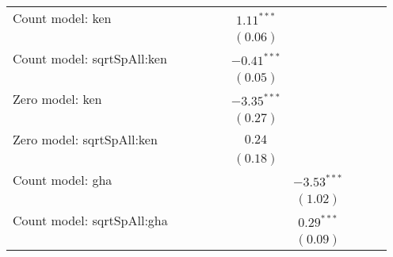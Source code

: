 \begin{center}
\begin{longtable}{l c c c c c c c c c}
Count model: ken               &                &                &                &                 & $1.11^{***}$   &                 &                 &                 &                \\
                               &                &                &                &                 & $(0.06)$       &                 &                 &                 &                \\
Count model: sqrtSpAll:ken     &                &                &                &                 & $-0.41^{***}$  &                 &                 &                 &                \\
                               &                &                &                &                 & $(0.05)$       &                 &                 &                 &                \\
Zero model: ken                &                &                &                &                 & $-3.35^{***}$  &                 &                 &                 &                \\
                               &                &                &                &                 & $(0.27)$       &                 &                 &                 &                \\
Zero model: sqrtSpAll:ken      &                &                &                &                 & $0.24$         &                 &                 &                 &                \\
                               &                &                &                &                 & $(0.18)$       &                 &                 &                 &                \\
Count model: gha               &                &                &                &                 &                & $-3.53^{***}$   &                 &                 &                \\
                               &                &                &                &                 &                & $(1.02)$        &                 &                 &                \\
Count model: sqrtSpAll:gha     &                &                &                &                 &                & $0.29^{***}$    &                 &                 &                \\
                               &                &                &                &                 &                & $(0.09)$        &                 &                 &                \\

\end{longtable}
\end{center}
